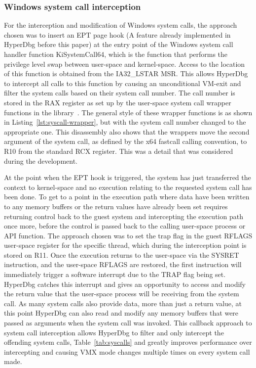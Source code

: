 \subsubsection{Windows system call interception}\label{syscall_interception}
For the interception and modification of Windows system calls, the approach chosen was to insert an EPT page hook (A feature already implemented in HyperDbg before this paper) 
at the entry point of the Windows system call handler function KiSystemCall64, which is the function that performs the privilege level swap between user-space and kernel-space. 
Access to the location of this function is obtained from the IA32\_LSTAR MSR. 
This allows HyperDbg to intercept all calls to this function by causing an unconditional VM-exit and filter the system calls based on their system call number. 
The call number is stored in the RAX register as set up by the user-space system call wrapper functions in the  library~\cite{ntdll-lib}. The general style of these 
wrapper functions is as shown in Listing~\ref{lst:syscall-wrapper}, but with the system call number changed to the appropriate one.
This disassembly also shows that the wrappers move the second argument of the system call, as defined by the x64 fastcall calling convention, 
to R10 from the standard RCX register. This was a detail that was considered during the development.

At the point when the EPT hook is triggered, the system has just transferred the context to kernel-space and no execution relating to the requested system call has been done. 
To get to a point in the execution path where data have been written to any memory buffers or the return values have already been set 
requires returning control back to the guest system and intercepting the execution path once more, before the control is passed back to the calling user-space process or API function. 
The approach chosen was to set the trap flag in the guest RFLAGS user-space register for the specific thread, which during the interception point is stored on R11. 
Once the execution returns to the user-space via the SYSRET instruction, and the user-space RFLAGS are restored, the first instruction will immediately trigger a software interrupt due to the TRAP flag
being set. HyperDbg catches this interrupt and gives an opportunity to access and modify the return value that the user-space process will be receiving from the system call. 
As many system calls also provide data, more than just a return value, at this point HyperDbg can also read and modify any memory buffers that were 
passed as arguments when the system call was invoked. This callback approach to system call interception allows HyperDbg to filter and only intercept 
the offending system calls, Table~\ref{tab:syscalls} and greatly improves performance over intercepting and causing VMX mode changes multiple times on every system call made.

